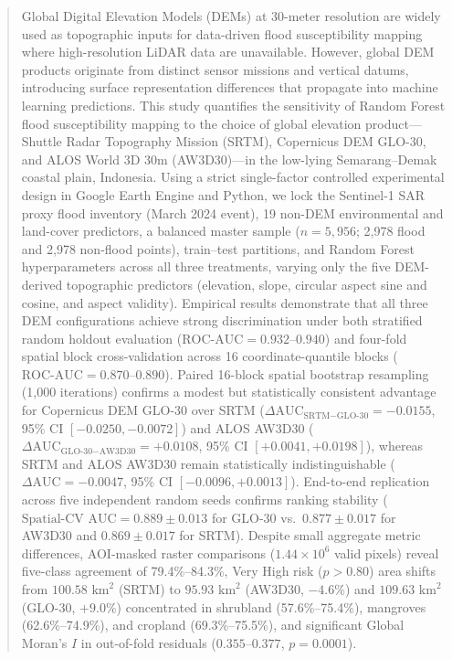 \documentclass[11pt,twoside]{article}
\author{
\begin{minipage}{\textwidth}
\authorone,
\authortwo
\\[1em]
$^1$ \affilone\\
\corrauthor
\end{minipage}
}
\date{\vspace{-1.5em}}
\begin{document}
\maketitle

\begin{abstract}
Global Digital Elevation Models (DEMs) at 30-meter resolution are widely used as topographic inputs for data-driven flood susceptibility mapping where high-resolution LiDAR data are unavailable. However, global DEM products originate from distinct sensor missions and vertical datums, introducing surface representation differences that propagate into machine learning predictions. This study quantifies the sensitivity of Random Forest flood susceptibility mapping to the choice of global elevation product---Shuttle Radar Topography Mission (SRTM), Copernicus DEM GLO-30, and ALOS World 3D 30m (AW3D30)---in the low-lying Semarang--Demak coastal plain, Indonesia. Using a strict single-factor controlled experimental design in Google Earth Engine and Python, we lock the Sentinel-1 SAR proxy flood inventory (March 2024 event), 19 non-DEM environmental and land-cover predictors, a balanced master sample ($n = 5{,}956$; 2,978 flood and 2,978 non-flood points), train--test partitions, and Random Forest hyperparameters across all three treatments, varying only the five DEM-derived topographic predictors (elevation, slope, circular aspect sine and cosine, and aspect validity). Empirical results demonstrate that all three DEM configurations achieve strong discrimination under both stratified random holdout evaluation ($\text{ROC-AUC} = 0.932\text{--}0.940$) and four-fold spatial block cross-validation across 16 coordinate-quantile blocks ($\text{ROC-AUC} = 0.870\text{--}0.890$). Paired 16-block spatial bootstrap resampling (1,000 iterations) confirms a modest but statistically consistent advantage for Copernicus DEM GLO-30 over SRTM ($\Delta\text{AUC}_{\text{SRTM}-\text{GLO-30}} = -0.0155$, 95\% CI $[-0.0250, -0.0072]$) and ALOS AW3D30 ($\Delta\text{AUC}_{\text{GLO-30}-\text{AW3D30}} = +0.0108$, 95\% CI $[+0.0041, +0.0198]$), whereas SRTM and ALOS AW3D30 remain statistically indistinguishable ($\Delta\text{AUC} = -0.0047$, 95\% CI $[-0.0096, +0.0013]$). End-to-end replication across five independent random seeds confirms ranking stability ($\text{Spatial-CV AUC} = 0.889 \pm 0.013$ for GLO-30 vs.\ $0.877 \pm 0.017$ for AW3D30 and $0.869 \pm 0.017$ for SRTM). Despite small aggregate metric differences, AOI-masked raster comparisons ($1.44 \times 10^6$ valid pixels) reveal five-class agreement of 79.4\%--84.3\%, Very High risk ($p > 0.80$) area shifts from $100.58\text{ km}^2$ (SRTM) to $95.93\text{ km}^2$ (AW3D30, $-4.6\%$) and $109.63\text{ km}^2$ (GLO-30, $+9.0\%$) concentrated in shrubland (57.6\%--75.4\%), mangroves (62.6\%--74.9\%), and cropland (69.3\%--75.5\%), and significant Global Moran's $I$ in out-of-fold residuals ($0.355\text{--}0.377$, $p = 0.0001$).
\end{abstract}
\end{document}
